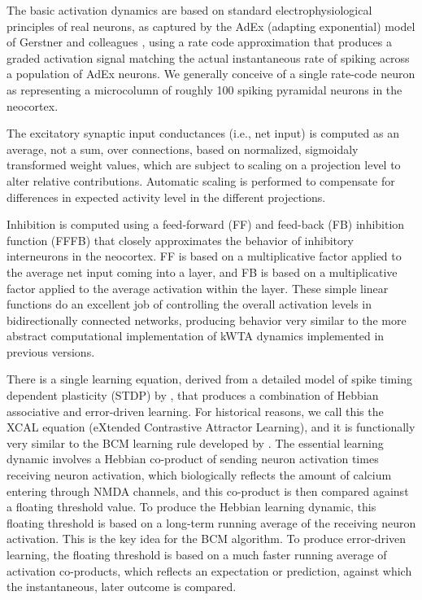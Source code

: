 \documentclass[11pt,twoside]{article}
\newif\myifpdf
\begin{document}
The basic activation dynamics are based on standard electrophysiological principles of real neurons, as captured by the AdEx (adapting exponential) model of Gerstner and colleagues \citep{BretteGerstner05}, using a rate code approximation that produces a graded activation signal matching the actual instantaneous rate of spiking across a population of AdEx neurons.  We generally conceive of a single rate-code neuron as representing a microcolumn of roughly 100 spiking pyramidal neurons in the neocortex.
 
The excitatory synaptic input conductances (i.e., net input) is computed as an average, not a sum, over connections, based on normalized, sigmoidaly transformed weight values, which are subject to scaling on a projection level to alter relative contributions. Automatic scaling is performed to compensate for differences in expected activity level in the different projections.

Inhibition is computed using a feed-forward (FF) and feed-back (FB) inhibition function (FFFB) that closely approximates the behavior of inhibitory interneurons in the neocortex. FF is based on a multiplicative factor applied to the average net input coming into a layer, and FB is based on a multiplicative factor applied to the average activation within the layer. These simple linear functions do an excellent job of controlling the overall activation levels in bidirectionally connected networks, producing behavior very similar to the more abstract computational implementation of kWTA dynamics implemented in previous versions.

There is a single learning equation, derived from a detailed model of spike timing dependent plasticity (STDP) by \citet{UrakuboHondaFroemkeEtAl08}, that produces a combination of Hebbian associative and error-driven learning. For historical reasons, we call this the XCAL equation (eXtended Contrastive Attractor Learning), and it is functionally very similar to the BCM learning rule developed by \citet{BienenstockCooperMunro82}. The essential learning dynamic involves a Hebbian co-product of sending neuron activation times receiving neuron activation, which biologically reflects the amount of calcium entering through NMDA channels, and this co-product is then compared against a floating threshold value. To produce the Hebbian learning dynamic, this floating threshold is based on a long-term running average of the receiving neuron activation. This is the key idea for the BCM algorithm. To produce error-driven learning, the floating threshold is based on a much faster running average of activation co-products, which reflects an expectation or prediction, against which the instantaneous, later outcome is compared.
\end{document}

